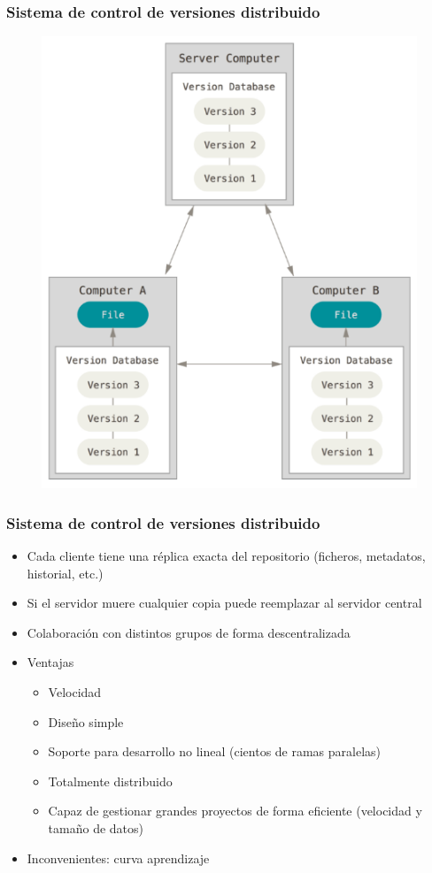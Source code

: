 \documentclass{beamer}
\begin{document}
\begin{frame}
\frametitle{Sistema de control de versiones distribuido}
\begin{figure}
\includegraphics[width=0.50\linewidth]{img/distributed.png}
\end{figure}
\end{frame}

\begin{frame}
\frametitle{Sistema de control de versiones distribuido}
\begin{itemize}
\item Cada cliente tiene una réplica exacta del repositorio (ficheros, metadatos, historial, etc.)
\item Si el servidor muere cualquier copia puede reemplazar al servidor central
\item Colaboración con distintos grupos de forma descentralizada
\item Ventajas
\begin{itemize}
\item Velocidad
\item Diseño simple
\item Soporte para desarrollo no lineal (cientos de ramas paralelas)
\item Totalmente distribuido
\item Capaz de gestionar grandes proyectos de forma eficiente (velocidad y tamaño de datos)
\end{itemize}
\item Inconvenientes: curva aprendizaje
\end{itemize}
\end{frame}
\end{document}
